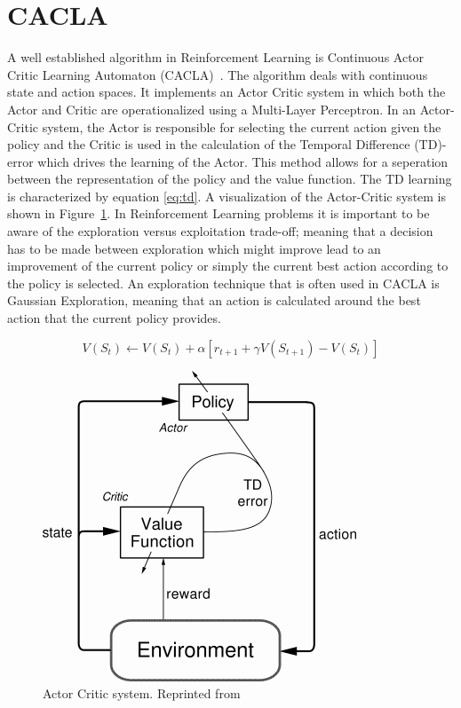 
\section{CACLA}
A well established algorithm in Reinforcement Learning is Continuous Actor Critic Learning Automaton (CACLA)~\cite{van2007reinforcement}. The algorithm deals with continuous state and action spaces. It implements an Actor Critic system in which both the Actor and Critic are operationalized using a Multi-Layer Perceptron. In an Actor-Critic system, the Actor is responsible for selecting the current action given the policy and the Critic is used in the calculation of the Temporal Difference (TD)-error which drives the learning of the Actor. This method allows for a seperation between the representation of the policy and the value function. The TD learning is characterized by equation \eqref{eq:td}. A visualization of the Actor-Critic system is shown in Figure~\ref{fig:actorcriticsystem}. In Reinforcement Learning problems it is important to be aware of the exploration versus exploitation trade-off; meaning that a decision has to be made between exploration which might improve lead to an improvement of the current policy or simply the current best action according to the policy is selected. An exploration technique that is often used in CACLA is Gaussian Exploration, meaning that an action is calculated around the best action that the current policy provides.  

\begin{equation}
\label{eq:td}
V(S_t) \leftarrow V(S_t) + \alpha[r_{t+1} + \gamma V(S_{t+1}) - V(S_t)]
\end{equation}


\begin{figure}[t]
 \centering 
    \includegraphics[width = 0.35\columnwidth]{figs/actorcritic.png}
 \caption{Actor Critic system. Reprinted from~\cite{sutton1998reinforcement}}
\label{fig:actorcriticsystem}
\end{figure}



